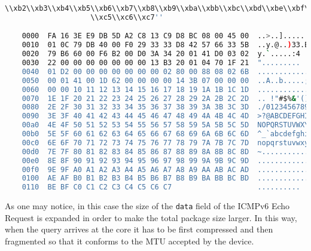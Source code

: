 \begin{lstlisting}[language=bash, basicstyle=\ttfamily\tiny, showstringspaces=false]
                    \\xb2\\xb3\\xb4\\xb5\\xb6\\xb7\\xb8\\xb9\\xba\\xbb\\xbc\\xbd\\xbe\\xbf\\xc0\\xc1\\xc2\\xc3\\xc4
                    \\xc5\\xc6\\xc7''

    0000  FA 16 3E E9 DB 5D A2 C8 13 C9 D8 BC 08 00 45 00  ..>..]........E.
    0010  01 0C 79 DB 40 00 F0 29 33 33 D8 42 57 66 33 5B  ..y.@..)33.BWf3[
    0020  79 B6 60 00 F6 B2 00 D0 3A 34 20 01 41 D0 03 02  y.`.....:4 .A...
    0030  22 00 00 00 00 00 00 00 13 B3 20 01 04 70 1F 21  "......... ..p.!
    0040  01 D2 00 00 00 00 00 00 00 02 80 00 88 08 02 6B  ...............k
    0050  00 01 41 00 1D 62 00 00 00 00 14 3B 07 00 00 00  ..A..b.....;....
    0060  00 00 10 11 12 13 14 15 16 17 18 19 1A 1B 1C 1D  ................
    0070  1E 1F 20 21 22 23 24 25 26 27 28 29 2A 2B 2C 2D  .. !"#$%&'()*+,-
    0080  2E 2F 30 31 32 33 34 35 36 37 38 39 3A 3B 3C 3D  ./0123456789:;<=
    0090  3E 3F 40 41 42 43 44 45 46 47 48 49 4A 4B 4C 4D  >?@ABCDEFGHIJKLM
    00a0  4E 4F 50 51 52 53 54 55 56 57 58 59 5A 5B 5C 5D  NOPQRSTUVWXYZ[\]
    00b0  5E 5F 60 61 62 63 64 65 66 67 68 69 6A 6B 6C 6D  ^_`abcdefghijklm
    00c0  6E 6F 70 71 72 73 74 75 76 77 78 79 7A 7B 7C 7D  nopqrstuvwxyz{|}
    00d0  7E 7F 80 81 82 83 84 85 86 87 88 89 8A 8B 8C 8D  ~...............
    00e0  8E 8F 90 91 92 93 94 95 96 97 98 99 9A 9B 9C 9D  ................
    00f0  9E 9F A0 A1 A2 A3 A4 A5 A6 A7 A8 A9 AA AB AC AD  ................
    0100  AE AF B0 B1 B2 B3 B4 B5 B6 B7 B8 B9 BA BB BC BD  ................
    0110  BE BF C0 C1 C2 C3 C4 C5 C6 C7                    ..........
\end{lstlisting}

As one may notice, in this case the size of the \texttt{data} field of the ICMPv6 Echo Request is expanded in order to make the total package size larger. 
In this way, when the query arrives at the core it has to be first compressed and then fragmented so that it conforms to the MTU accepted by the device.

